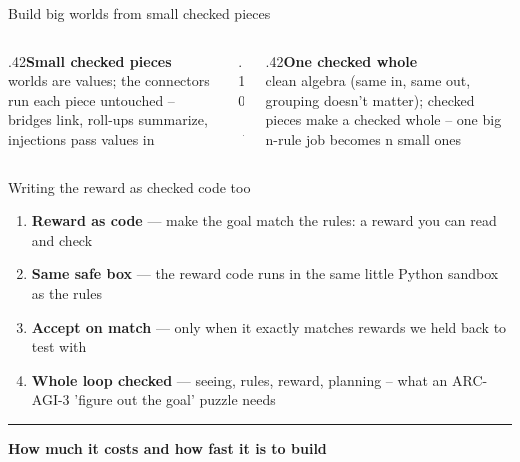 \documentclass[aspectratio=169,11pt]{beamer}
\begin{document}
\begin{frame}{Build big worlds from small checked pieces}\vfill\begin{columns}[c]\begin{column}{.42\textwidth}{\color{owdeep}\large\bfseries Small checked pieces}\\[3pt]{\color{owmuted}worlds are values; the connectors run each piece untouched -- bridges link, roll-ups summarize, injections pass values in}\end{column}\begin{column}{.10\textwidth}\begin{center}{\color{owochre}\Huge$\rightarrow$}\end{center}\end{column}\begin{column}{.42\textwidth}{\color{owdeep}\large\bfseries One checked whole}\\[3pt]{\color{owmuted}clean algebra (same in, same out, grouping doesn't matter); checked pieces make a checked whole -- one big n-rule job becomes n small ones}\end{column}\end{columns}\vfill\end{frame}
\begin{frame}{Writing the reward as checked code too}\vfill\begin{enumerate}\item \textbf{Reward as code} --- make the goal match the rules: a reward you can read and check\item \textbf{Same safe box} --- the reward code runs in the same little Python sandbox as the rules\item \textbf{Accept on match} --- only when it exactly matches rewards we held back to test with\item \textbf{Whole loop checked} --- seeing, rules, reward, planning -- what an ARC-AGI-3 'figure out the goal' puzzle needs\end{enumerate}\vfill\end{frame}
\begin{frame}[plain]\centering\vfill
{\color{owochre}\rule{40pt}{2.5pt}}\par\vskip10pt
{\color{owdeep}\bfseries\Large How much it costs and how fast it is to build\par}\vfill\end{frame}
\end{document}
